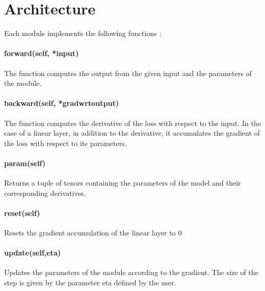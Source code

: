 \documentclass{article}
\begin{document}
\thispagestyle{fancy}

\section{Architecture}

Each module implements the following functions : 

\paragraph{forward(self, *input)}
The function computes the output from the given input and the parameters of the module.
    
\paragraph{backward(self, *gradwrtoutput)}
The function computes the derivative of the loss with respect to the input. In the case of a linear layer, in addition to the derivative, it accumulates the gradient of the loss with respect to its parameters. 
    
\paragraph{param(self)}
Returns a tuple of tenors containing the parameters of the model and their corresponding derivatives. 
    
\paragraph{reset(self)}
Resets the gradient accumulation of the linear layer to 0
    
\paragraph{update(self,eta)}
Updates the parameters of the module according to the gradient. The size of the step is given by the parameter eta defined by the user. 
\end{document}
